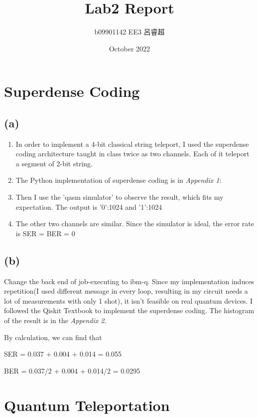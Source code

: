\documentclass{article}
\title{Lab2 Report}
\author{b09901142 EE3 呂睿超}
\date{October 2022}
\begin{document}
\begin{CJK*}{UTF8}{bsmi}
\maketitle

\section{Superdense Coding}
\subsection{(a)}
\begin{enumerate}
\item In order to implement a 4-bit classical string teleport, I used the superdense coding architecture taught in class twice as two channels. Each of it teleport a segment of 2-bit string. 
\item The Python implementation of superdense coding is in \emph {Appendix 1}:

\item Then I use the 'qasm simulator' to observe the result, which fits my expectation.
The output is  {'0':1024} and {'1':1024}
\item The other two channels are similar. Since the simulator is ideal, the error rate is 
SER = BER = 0
\end{enumerate}
\subsection{(b)} 
\quad Change the back end of job-executing to ibm-q.
Since my implementation induces repetition(I used different message in every loop, resulting in my circuit needs a lot of measurements with only 1 shot), it isn't feasible on real quantum devices.
I followed the Qiskit Textbook to implement the superdense coding.
The histogram of the result is in the \emph {Appendix 2}.


By calculation, we can find that

SER = 0.037 + 0.004 + 0.014 = 0.055

BER = 0.037/2 + 0.004 + 0.014/2 = 0.0295

\section{Quantum Teleportation}

\end{CJK*}
\end{document}
